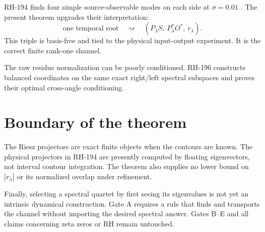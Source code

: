 \documentclass[12pt]{article}
\theoremstyle{remark}
\begin{document}
RH-194 finds four simple source-observable modes on each side at
$\sigma=0.01$ \citep{WangRH194}.  The present theorem upgrades their
interpretation:
\begin{equation*}
 \text{one temporal root}
 \quad\rightsquigarrow\quad
 (P_\lambda S,\,P_\lambda^*O^*,\,r_\lambda).
\end{equation*}
This triple is basis-free and tied to the physical input-output experiment.
It is the correct finite rank-one channel.

The raw residue normalization can be poorly conditioned.  RH-196 constructs
balanced coordinates on the same exact right/left spectral subspaces and
proves their optimal cross-angle conditioning.

\section{Boundary of the theorem}

The Riesz projectors are exact finite objects when the contours are known.
The physical projectors in RH-194 are presently computed by floating
eigenvectors, not interval contour integration.  The theorem also supplies
no lower bound on $|r_\lambda|$ or its normalized overlap under refinement.

Finally, selecting a spectral quartet by first seeing its eigenvalues is not
yet an intrinsic dynamical construction.  Gate A requires a rule that finds
and transports the channel without importing the desired spectral answer.
Gates B--E and all claims concerning zeta zeros or RH remain untouched.



\end{document}
